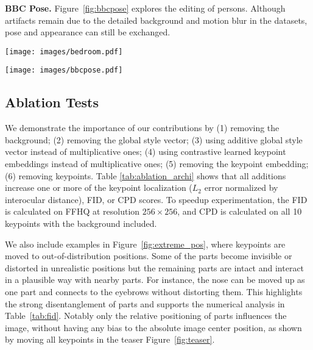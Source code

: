 \documentclass[10pt, conference, compsocconf]{IEEEtran}
\begin{document}
\textbf{BBC Pose.} Figure~\ref{fig:bbcpose} explores the editing of persons. Although artifacts remain due to the detailed background and motion blur in the datasets, pose and appearance can still be exchanged.   

\begin{figure*}[t]
\begin{center}
   \texttt{[image: images/bedroom.pdf]}
\end{center}
   \caption{\textbf{Editing on Bedroom} by (top-left) interpolating the keypoint embeddings of curtain and window and (top-right) moving bed and light; and (bottom) removing and adding objects}
\label{fig:bedroom}
\end{figure*}


\begin{figure*}[t]
\begin{center}
   \texttt{[image: images/bbcpose.pdf]}
\end{center}
   \caption{\textbf{Editing on BBC Pose.} The first row shows the source image and the second row the editing results. 
   \textbf{Left:} the human appearance is swapped with the small target image. 
   \textbf{Center:} changing the position to the one in the overlay. 
   \textbf{Right:} changing the background (inset shows the difference). 
   }
\label{fig:bbcpose}
\end{figure*}

\subsection{Ablation Tests}

We demonstrate the importance of our contributions by (1) removing the background; (2) removing the global style vector; (3) using additive global style vector instead of multiplicative ones; (4) using contrastive learned keypoint embeddings instead of multiplicative ones; (5) removing the keypoint embedding; (6) removing keypoints.  Table \ref{tab:ablation_archi} shows that all additions increase one or more of the keypoint localization ($L_2$  error normalized by interocular distance), FID, or CPD scores. 
To speedup experimentation, the FID is calculated on FFHQ at resolution $256\times256$,
and CPD is calculated on all 10 keypoints with the background included. 

We also include examples in Figure~\ref{fig:extreme_pos}, where keypoints are moved to out-of-distribution positions. Some of the parts become invisible or distorted in unrealistic positions but the remaining parts are intact and interact in a plausible way with nearby parts. For instance, the nose can be moved up as one part and connects to the eyebrows without distorting them. This highlights the strong disentanglement of parts and supports the numerical analysis in Table~\ref{tab:fid}. Notably only the relative positioning of parts influences the image, without having any bias to the absolute image center position, as shown by moving all keypoints in the teaser Figure~\ref{fig:teaser}.
\end{document}
